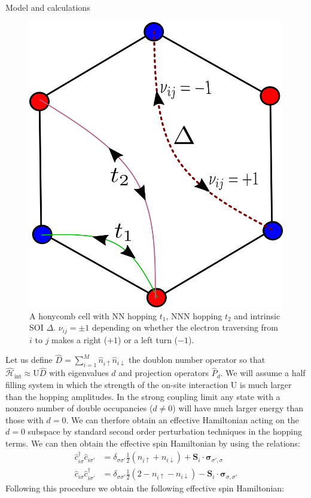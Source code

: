 \documentclass[aps,prl,twocolumn,amsmath,amssymb,superscriptaddress,nobibnotes]{revtex4-1}%
\newcommand{\bs}{\boldsymbol}
\begin{document}
\begin{section}{Model and calculations}
\begin{figure}[t]
\includegraphics[width=0.6\columnwidth]{../Figures/kmh.png}
\caption{A honycomb cell with NN hopping $t_1$, NNN hopping $t_2$ and intrinsic SOI $\Delta$. $\nu_{ij} = \pm 1$ depending on whether the electron traversing from $i$ to $j$ makes a right ($+1$) or a left turn ($-1$).}
\label{fig1}
\vspace*{-6pt}
\end{figure}
Let us define $\hat{D} = \sum_{i=1}^M \hat{n}_{i\uparrow}\hat{n}_{i\downarrow}$ the doublon number operator so that $\hat{\mathcal{H}}_{\text{int}} \approx \text{U}\hat{D}$ with eigenvalues $d$ and projection operators $\hat{P}_d$. We will assume a half filling system in which the strength of the on-site interaction $\text{U}$ is much larger than the hopping amplitudes. In the strong coupling limit any state with a nonzero number of double occupancies ($d \neq 0$) will have much larger energy than those with $d=0$. We can therfore obtain an effective Hamiltonian acting on the $d=0$ subspace by standard second order perturbation techniques in the hopping terms. We can then obtain the effective spin Hamiltonian by using the relations:
\begin{align}
\hat{c}_{i \sigma}^\dagger \hat{c}_{i \sigma'} &= \delta_{\sigma \sigma'} \frac{1}{2} (n_{i \uparrow} + n_{i \downarrow}) + \bs{S}_i\cdot\bs{\sigma}_{\sigma', \sigma} \label{SpinOperatorInv1}\\ 
\hat{c}_{i \sigma} \hat{c}_{i \sigma'}^\dagger &= \delta_{\sigma \sigma'} \frac{1}{2} (2 - n_{i \uparrow} - n_{i \downarrow}) - \bs{S}_i\cdot\bs{\sigma}_{\sigma, \sigma'} \label{SpinOperatorInv2}
\end{align}
Following this procedure we obtain the following effective spin Hamiltonian:


\end{section}
\end{document}

